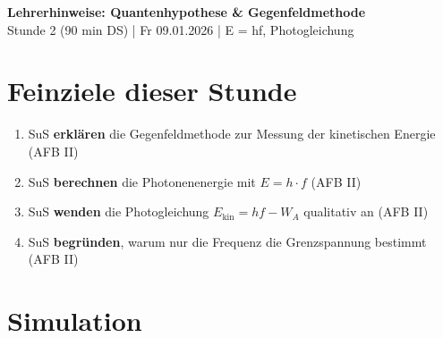 \documentclass[11pt,a4paper]{article}
\begin{document}
\begin{center}
{\Large\textbf{Lehrerhinweise: Quantenhypothese \& Gegenfeldmethode}}\\[0.3em]
{\normalsize Stunde 2 (90 min DS) | Fr 09.01.2026 | E = hf, Photogleichung}
\end{center}

\vspace{0.3em}


\section*{Feinziele dieser Stunde}

\begin{enumerate}[nosep]
\item SuS \textbf{erklären} die Gegenfeldmethode zur Messung der kinetischen Energie (AFB II)
\item SuS \textbf{berechnen} die Photonenenergie mit $E = h \cdot f$ (AFB II)
\item SuS \textbf{wenden} die Photogleichung $E_{\text{kin}} = hf - W_A$ qualitativ an (AFB II)
\item SuS \textbf{begründen}, warum nur die Frequenz die Grenzspannung bestimmt (AFB II)
\end{enumerate}

\vspace{0.5em}


\section*{Simulation}
\end{document}
